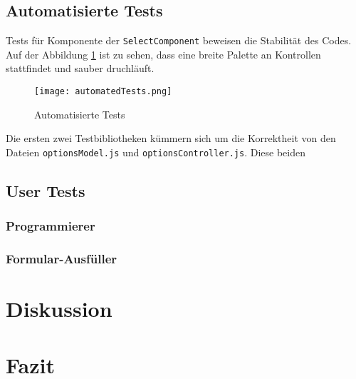 \subsection{Automatisierte Tests}
\label{sec:automatedTests}

Tests für Komponente der \texttt{SelectComponent} beweisen die Stabilität des Codes.
Auf der Abbildung \ref{img:automatedTests} ist zu sehen, dass eine breite Palette an Kontrollen stattfindet und sauber druchläuft. 

\begin{figure}[!htb]
    \centering
    \texttt{[image: automatedTests.png]}
    \caption{Automatisierte Tests}
    \label{img:automatedTests}
\end{figure}

Die ersten zwei Testbibliotheken kümmern sich um die Korrektheit von den Dateien \texttt{optionsModel.js} und \texttt{optionsController.js}. 
Diese beiden 


\subsection{User Tests} %
\label{sec:userTests}


\subsubsection{Programmierer}
\label{sec:userTestsProgrammer}


\subsubsection{Formular-Ausfüller}
\label{sec:userTestsEnduser}



\section{Diskussion}
\label{sec:discusion}


\section{Fazit}
\label{sec:summeryNew}

